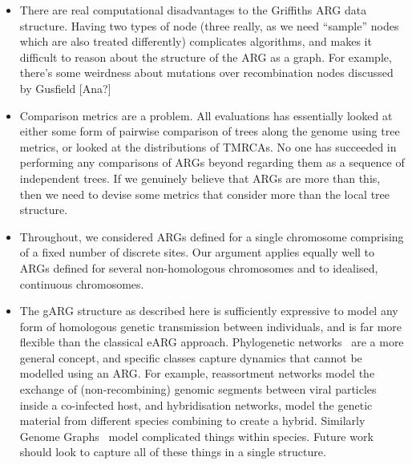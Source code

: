 \documentclass{article}
\begin{document}
\begin{itemize}
\item There are real computational disadvantages to the Griffiths ARG
data structure. Having two types of node (three really, as we need
``sample'' nodes which are also treated differently) complicates algorithms,
and makes it difficult to reason about the structure of the ARG as a
graph. For example, there's some weirdness about mutations over
recombination nodes discussed by Gusfield [Ana?]

\item Comparison metrics are a problem. All evaluations has essentially
looked at either some form of pairwise comparison of trees along the genome
using tree metrics, or looked at the distributions of TMRCAs. No
one has succeeded in performing any comparisons of ARGs beyond
regarding them as a sequence of independent trees. If we genuinely believe
that ARGs are more than this, then we need to devise some metrics that
consider more than the local tree structure.

\item Throughout, we considered ARGs defined for a single chromosome comprising
of a fixed number of discrete sites. Our argument applies equally well to ARGs
defined for several non-homologous chromosomes \citep{fearnhead2003ancestral,
koskela2019robust} and to idealised, continuous chromosomes.

\item The gARG structure as described here is sufficiently expressive
to model any form of homologous genetic transmission between individuals,
and is far more flexible than the classical eARG approach.
Phylogenetic networks~\citep{huson2010phylogenetic} are a more
general concept, and specific classes capture dynamics that
cannot be modelled using an ARG. For example,
reassortment networks model the exchange of
(non-recombining) genomic segments between viral particles inside a co-infected host,
and hybridisation networks, model the genetic material from
different species combining to create a hybrid.
Similarly Genome Graphs~\cite{novak2017genome} model complicated things
within species. Future work should look to capture all of these things
in a single structure.

\end{itemize}
\end{document}

